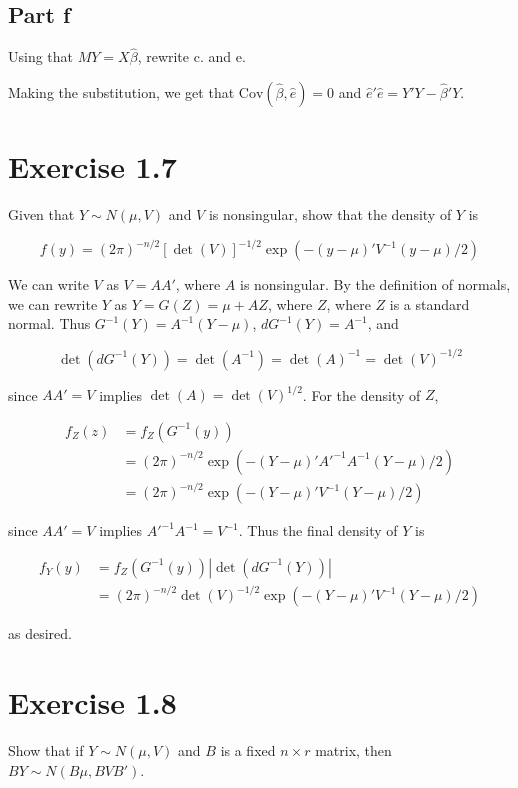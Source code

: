 \documentclass{article}
\newcommand{\cov}{\text{Cov}}
\begin{document}
\subsection*{Part f}

Using that $MY=X\hat{\beta}$, rewrite c. and e.

Making the substitution, we get that $\cov(\hat{\beta}, \hat{e}) = 0$ and $\hat{e}'\hat{e} = Y'Y - \hat{\beta}'Y$.

\section*{Exercise 1.7}

Given that $Y \sim N(\mu, V)$ and $V$ is nonsingular, show that the density of $Y$ is

\[
f(y) = (2\pi)^{-n/2}[\det(V)]^{-1/2}\exp(-(y-\mu)'V^{-1}(y-\mu)/2)
\]

We can write $V$ as $V = AA'$, where $A$ is nonsingular. By the definition of normals, we can rewrite $Y$ as $Y = G(Z)= \mu + AZ$, where $Z$, where $Z$ is a standard normal. Thus $G^{-1}(Y) = A^{-1}(Y-\mu)$,  $dG^{-1}(Y) = A^{-1}$, and

\[
\det(dG^{-1}(Y)) = \det(A^{-1}) = \det(A)^{-1} = \det(V)^{-1/2}
\]

since $AA' = V$ implies $\det(A) = \det(V)^{1/2}$. For the density of $Z$,

\begin{align*}
f_Z(z) &= f_Z(G^{-1}(y)) \\
&= (2\pi)^{-n/2}\exp(
-(Y-\mu)'A'^{-1}A^{-1}(Y-\mu)/2
) \\
&= (2\pi)^{-n/2}\exp(
-(Y-\mu)'V^{-1}(Y-\mu)/2
)
\end{align*}

since $AA'=V$ implies $A'^{-1}A^{-1}=V^{-1}$. Thus the final density of $Y$ is

\begin{align*}
f_Y(y) &= f_Z(G^{-1}(y))|\det(dG^{-1}(Y))| \\
&= (2\pi)^{-n/2}\det(V)^{-1/2}\exp(
-(Y-\mu)'V^{-1}(Y-\mu)/2
)
\end{align*}

as desired.

\section*{Exercise 1.8}

Show that if $Y\sim N(\mu, V)$ and $B$ is a fixed $n \times r$ matrix, then $BY \sim N(B\mu, BVB')$.
\end{document}
